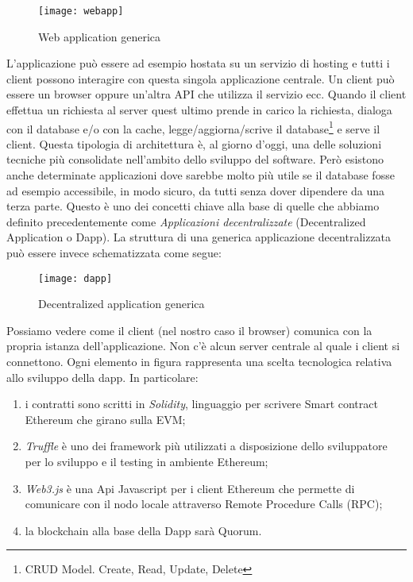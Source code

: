 \begin{center}
	\begin{figure}[H]
		\centering
		\texttt{[image: webapp]}
		\caption{Web application generica}
		\label{fig:web application generica}
	\end{figure}
\end{center}
L'applicazione può essere ad esempio hostata su un servizio di hosting e tutti i client possono interagire con questa singola applicazione centrale. Un client può essere un browser oppure un'altra API che utilizza il servizio ecc. Quando il client effettua un richiesta al server quest ultimo prende in carico la richiesta, dialoga con il database e/o con la cache, legge/aggiorna/scrive il database\footnote{CRUD Model. Create, Read, Update, Delete} e serve il client. Questa tipologia di architettura è, al giorno d'oggi, una delle soluzioni tecniche più consolidate nell'ambito dello sviluppo del software. Però esistono anche determinate applicazioni dove sarebbe molto più utile se il database fosse ad esempio accessibile, in modo sicuro, da tutti senza dover dipendere da una terza parte. Questo è uno dei concetti chiave alla base di quelle che abbiamo definito precedentemente come \emph{Applicazioni decentralizzate} (Decentralized Application o Dapp). La struttura di una generica applicazione decentralizzata può essere invece schematizzata come segue:
\newline
%
\begin{center}
	\begin{figure}[H]
		\centering
		\texttt{[image: dapp]}
		\caption{Decentralized application generica}
		\label{fig:decentralized application generica}
	\end{figure}
\end{center}
Possiamo vedere come il client (nel nostro caso il browser) comunica con la propria istanza dell'applicazione. Non c'è alcun server centrale al quale i client si connettono. Ogni elemento in figura rappresenta una scelta tecnologica relativa allo sviluppo della dapp. In particolare:
\begin{enumerate}
	\item i contratti sono scritti in \emph{Solidity}, linguaggio per scrivere Smart contract Ethereum che girano sulla EVM;
	\item \emph{Truffle} è uno dei framework più utilizzati a disposizione dello sviluppatore per lo sviluppo e il testing in ambiente Ethereum;
	\item \emph{Web3.js} è una Api Javascript per i client Ethereum che permette di comunicare con il nodo locale attraverso Remote Procedure Calls (RPC);
	\item la blockchain alla base della Dapp sarà Quorum.
\end{enumerate}
%
